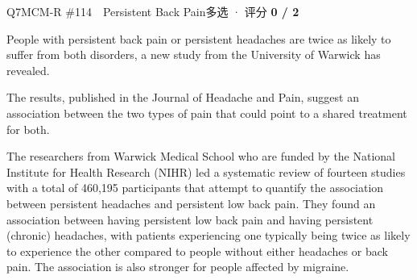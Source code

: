 \begin{qblock}{Q7\quad MCM-R \#114\ \ Persistent Back Pain}{多选 · 评分 \textcolor{cAccent}{\bfseries 0 / 2}}
\begin{promptbox}
People with persistent back pain or persistent headaches are twice as likely to suffer from both disorders, a new study from the University of Warwick has revealed.

The results, published in the Journal of Headache and Pain, suggest an association between the two types of pain that could point to a shared treatment for both.

The researchers from Warwick Medical School who are funded by the National Institute for Health Research (NIHR) led a systematic review of fourteen studies with a total of 460,195 participants that attempt to quantify the association between persistent headaches and persistent low back pain. They found an association between having persistent low back pain and having persistent (chronic) headaches, with patients experiencing one typically being twice as likely to experience the other compared to people without either headaches or back pain. The association is also stronger for people affected by migraine.


\end{promptbox}
\end{qblock}
